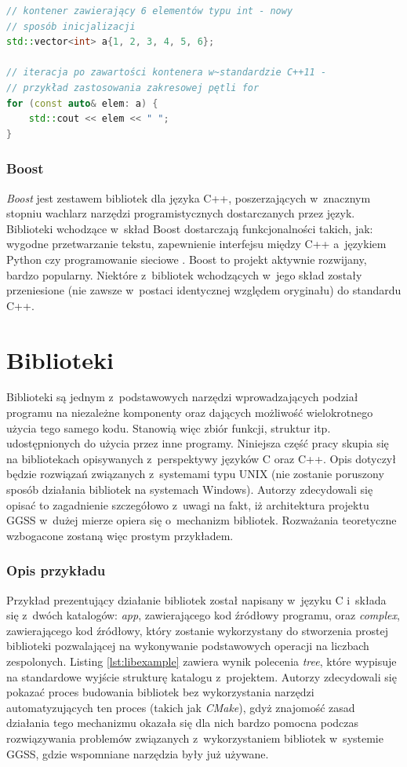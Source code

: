 \begin{lstlisting}[language=c++,caption={Przykład kodu w~języku C++ napisany z~wykorzystaniem funkcjonalności ze standardu C++11 (zakresowa pętla for)},label={lst:cpp11}]
// kontener zawierający 6 elementów typu int - nowy
// sposób inicjalizacji
std::vector<int> a{1, 2, 3, 4, 5, 6};

// iteracja po zawartości kontenera w~standardzie C++11 - 
// przykład zastosowania zakresowej pętli for
for (const auto& elem: a) {
	std::cout << elem << " ";
}
\end{lstlisting}


\subsubsection*{Boost}
\textit{Boost} jest zestawem bibliotek dla języka C++, poszerzających w~znacznym stopniu wachlarz narzędzi programistycznych dostarczanych przez język. Biblioteki wchodzące w~skład Boost dostarczają funkcjonalności takich, jak: wygodne przetwarzanie tekstu, zapewnienie interfejsu między C++ a~językiem Python czy programowanie sieciowe \cite{BoostDocs}. Boost to projekt aktywnie rozwijany, bardzo popularny. Niektóre z~bibliotek wchodzących w~jego skład zostały przeniesione (nie zawsze w~postaci identycznej względem oryginału) do standardu C++.

\section{Biblioteki}
Biblioteki są jednym z~podstawowych narzędzi wprowadzających podział programu na niezależne komponenty oraz dających możliwość wielokrotnego użycia tego samego kodu. Stanowią więc zbiór funkcji, struktur itp. udostępnionych do użycia przez inne programy. Niniejsza część pracy skupia się na bibliotekach opisywanych z~perspektywy języków C oraz C++. Opis dotyczył będzie rozwiązań związanych z~systemami typu UNIX (nie zostanie poruszony sposób działania bibliotek na systemach Windows). Autorzy zdecydowali się opisać to zagadnienie szczegółowo z~uwagi na fakt, iż architektura projektu GGSS w~dużej mierze opiera się o~mechanizm bibliotek. Rozważania teoretyczne wzbogacone zostaną więc prostym przykładem.

\subsubsection*{Opis przykładu}
Przykład prezentujący działanie bibliotek został napisany w~języku C i~składa się z~dwóch katalogów: \textit{app}, zawierającego kod źródłowy programu, oraz \textit{complex}, zawierającego kod źródłowy, który zostanie wykorzystany do stworzenia prostej biblioteki pozwalającej na wykonywanie podstawowych operacji na liczbach zespolonych. Listing \ref{lst:libexample} zawiera wynik polecenia \textit{tree}, które wypisuje na standardowe wyjście strukturę katalogu z~projektem. Autorzy zdecydowali się pokazać proces budowania bibliotek bez wykorzystania narzędzi automatyzujących ten proces (takich jak \textit{CMake}), gdyż znajomość zasad działania tego mechanizmu okazała się dla nich bardzo pomocna podczas rozwiązywania problemów związanych z~wykorzystaniem bibliotek w~systemie GGSS, gdzie wspomniane narzędzia były już używane.


